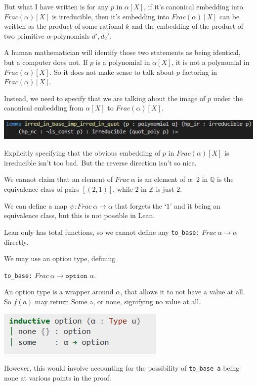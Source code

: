 \documentclass[pagesize=a4]{scrreprt}
\newcommand{\Z}{\mathbb{Z}}
\newcommand{\Q}{\mathbb{Q}}
\begin{document}
But what I have written is for any $p$ in $\alpha[X]$, if it's canonical embedding into $Frac(\alpha)[X]$ is irreducible, then it's embedding into $Frac(\alpha)[X]$ can be written as the product of some rational $k$ and the embedding of the product of two primitive $\alpha$-polynomials $d',d_2'$. 

A human mathematician will identify those two statements as being identical, but a computer does not. If $p$ is a polynomial in $\alpha[X]$, it is not a polynomial in $Frac(\alpha)[X]$. So it does not make sense to talk about $p$ factoring in $Frac(\alpha)[X]$. 

Instead, we need to specify that we are talking about the image of $p$ under the canonical embedding from $\alpha[X]$ to $Frac(\alpha)[X]$. 


\includegraphics[width=\textwidth]{gauss_fwd.png}
  
  Explicitly specifying that the obvious embedding of $p$ in $Frac (\alpha) [X]$ is irreducible isn't too bad. But the reverse direction isn't so nice. 
  
  We cannot claim that an element of $Frac\ \alpha$ is an element of $\alpha$. 2 in $\Q$ is the equivalence class of pairs $[(2,1)]$, while $2$ in $\Z$ is just $2$. 
 
We can define a map $\psi : Frac\ \alpha \rightarrow \alpha$ that forgets the `1' and it being an equivalence class, but this is not possible in Lean.

    Lean only has total functions, so we cannot define any \texttt{to\_base:} $Frac\ \alpha \rightarrow \alpha$ directly. 
    
    We may use an option type, defining 

    \texttt{to\_base:} $Frac\ \alpha \rightarrow \texttt{option } \alpha$. 

    An option type is a wrapper around $\alpha$, that allows it to not have a value at all.  So $f(a)$ may return Some a, or none, signifying no value at all. 


    \includegraphics[]{option.png}

    However, this would involve accounting for the possibility of \texttt{to\_base a} being none at various points in the proof. 
\end{document}
